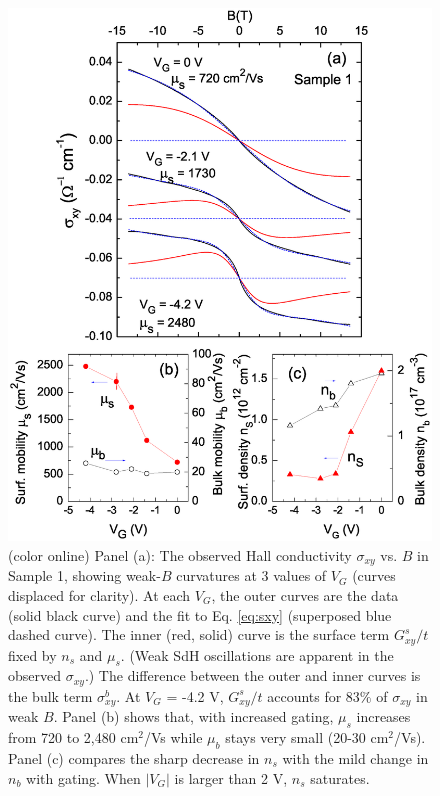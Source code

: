 \begin{figure}[!htbp]
  \begin{center}
\includegraphics[width=0.85\linewidth]{ch-liquid/figures/FigHallMob3}
\caption{\label{figHall} (color online) 
Panel (a): The observed Hall conductivity $\sigma_{xy}$ vs. $B$ in Sample 1,
showing weak-$B$ curvatures at 3 values of $V_G$
(curves displaced for clarity). At each $V_G$, the outer curves are the 
data (solid black curve) and the fit to Eq. \ref{eq:sxy} (superposed blue dashed curve). The inner
(red, solid) curve is the surface term
$G^s_{xy}/t$ fixed by $n_s$ and $\mu_s$. (Weak SdH oscillations are apparent in the
observed $\sigma_{xy}$.) The difference 
between the outer and inner curves is the bulk term $\sigma^b_{xy}$. 
At $V_G$ = -4.2 V, $G^s_{xy}/t$ accounts for 83$\%$ of
$\sigma_{xy}$ in weak $B$. 
Panel (b) shows that, with increased gating, $\mu_s$ increases from 720 to 2,480 cm$^2$/Vs 
while $\mu_b$ stays very small (20-30 cm$^2$/Vs). Panel (c) 
compares the sharp decrease in $n_s$ with the mild change in $n_b$ with gating. When $|V_G|$ is larger than
2 V, $n_s$ saturates.
}
  \end{center}
\end{figure} 


